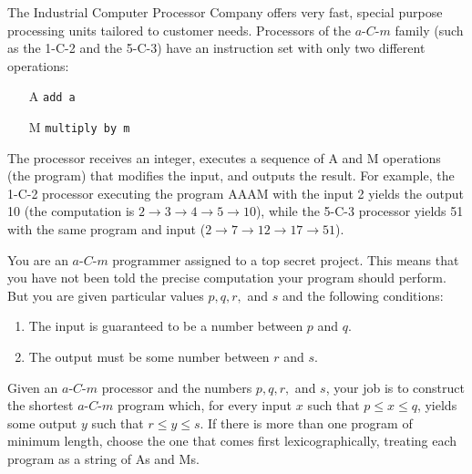 


The Industrial Computer Processor Company offers very fast, special purpose processing units tailored to customer needs. Processors of the $a$-$C$-$m$ family (such as the 1-C-2 and the 5-C-3) have an instruction set with only two different operations:

\vspace{.2cm}

\begin{itemize}
	\item[A] \texttt{add a}
	\item[M] \texttt{multiply by m}
\end{itemize}

\vspace{.2cm}

The processor receives an integer, executes a sequence of A and M operations (the program) that modifies the input, and outputs the result. For example, the 1-C-2 processor executing the program AAAM with the input 2 yields the output 10 (the computation is $2 \rightarrow 3 \rightarrow 4 \rightarrow 5 \rightarrow 10$), while the 5-C-3 processor yields 51 with the same program and input ($2 \rightarrow 7 \rightarrow 12 \rightarrow 17 \rightarrow 51$).
\vspace{.2cm}

You are an $a$-$C$-$m$ programmer assigned to a top secret project. This means that you have not been told the precise computation your program should perform. But you are given particular values $p, q, r,$ and $s$ and the following conditions:
\vspace{.2cm}

\begin{enumerate}
	\item The input is guaranteed to be a number between $p$ and $q$.
	\item The output must be some number between $r$ and $s$.
\end{enumerate}

Given an $a$-$C$-$m$ processor and the numbers $p, q, r,$ and $s$, your job is to construct the shortest $a$-$C$-$m$ program which, for every input $x$ such that $p \leq x \leq q$, yields some output $y$ such that $r \leq y \leq s$. If there is more than one program of minimum length, choose the one that comes first lexicographically, treating each program as a string of As and Ms.


